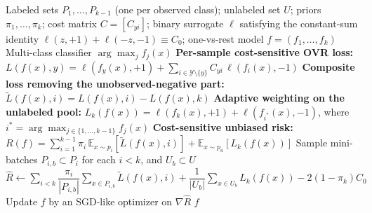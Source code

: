 \documentclass{article}
\begin{document}
\begin{algorithm}[!h]
\renewcommand{\algorithmicrequire}{\textbf{Input:}} %
\renewcommand{\algorithmicensure}{\textbf{Output:}} %
	\caption{Cost-sensitive unbiased risk estimation for multi-class PU learning} %
	\begin{algorithmic}[1] %
	    \REQUIRE
	    Labeled sets $P_{1},\dots,P_{k-1}$ (one per observed class); unlabeled set $U$;
	    priors $\pi_{1},\dots,\pi_{k}$; cost matrix $C=[C_{yi}]$;
	    binary surrogate $\ell$ satisfying the constant-sum identity $\ell(z,+1)+\ell(-z,-1)\equiv C_{0}$;
	    one-vs-rest model $f=(f_{1},\dots,f_{k})$
	    \ENSURE
	    Multi-class classifier $\arg\max_{j}f_{j}(x)$
	    \STATE \textbf{Per-sample cost-sensitive OVR loss:}
	    $L(f(x),y)=\ell(f_{y}(x),+1)+\sum_{i\in\mathcal{Y}\setminus\{y\}}C_{yi}\,\ell(f_{i}(x),-1)$ %
	    \STATE \textbf{Composite loss removing the unobserved-negative part:}
	    $\tilde{L}(f(x),i)=L(f(x),i)-L(f(x),k)$ %
	    \STATE \textbf{Adaptive weighting on the unlabeled pool:}
	    $L_{k}(f(x))=\ell(f_{k}(x),+1)+\ell(f_{i^{\ast}}(x),-1)$, where $i^{\ast}=\arg\max_{j\in\{1,\dots,k-1\}}f_{j}(x)$ %
	    \STATE \textbf{Cost-sensitive unbiased risk:}
	    $R(f)=\sum_{i=1}^{k-1}\pi_{i}\,\mathbb{E}_{x\sim p_{i}}\!\left[\tilde{L}(f(x),i)\right]+\mathbb{E}_{x\sim p_{u}}\!\left[L_{k}(f(x))\right]$
	    \STATE Sample mini-batches $P_{i,b}\subset P_{i}$ for each $i<k$, and $U_{b}\subset U$
	    \STATE $\hat{R}\leftarrow \sum_{i<k}\dfrac{\pi_{i}}{|P_{i,b}|}\sum_{x\in P_{i,b}}\tilde{L}(f(x),i)
	    +\dfrac{1}{|U_{b}|}\sum_{x\in U_{b}}L_{k}(f(x))-2(1-\pi_{k})C_{0}$ %
	    \STATE Update $f$ by an SGD-like optimizer on $\nabla\hat{R}$
	    \ENDWHILE
		\RETURN $f$
	\end{algorithmic}
\end{algorithm}
\end{document}
